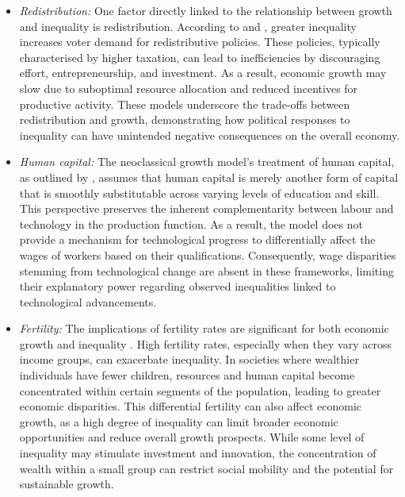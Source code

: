 \documentclass[12pt]{article}
\begin{document}
\begin{itemize}
    \item \textit{Redistribution:} One factor directly linked to the relationship between growth and inequality is redistribution. According to \textcite{alesina1994distributive} and \textcite{NBERw5658}, greater inequality increases voter demand for redistributive policies. These policies, typically characterised by higher taxation, can lead to inefficiencies by discouraging effort, entrepreneurship, and investment. As a result, economic growth may slow due to suboptimal resource allocation and reduced incentives for productive activity. These models underscore the trade-offs between redistribution and growth, demonstrating how political responses to inequality can have unintended negative consequences on the overall economy.
    \item \textit{Human capital:} The neoclassical growth model's treatment of human capital, as outlined by \textcite{Becker1993, Schultz1960}, assumes that human capital is merely another form of capital that is smoothly substitutable across varying levels of education and skill. This perspective preserves the inherent complementarity between labour and technology in the production function. As a result, the model does not provide a mechanism for technological progress to differentially affect the wages of workers based on their qualifications. Consequently, wage disparities stemming from technological change are absent in these frameworks, limiting their explanatory power regarding observed inequalities linked to technological advancements.
    \item \textit{Fertility:} The implications of fertility rates are significant for both economic growth and inequality \parencite{de2003inequality}. High fertility rates, especially when they vary across income groups, can exacerbate inequality. In societies where wealthier individuals have fewer children, resources and human capital become concentrated within certain segments of the population, leading to greater economic disparities. This differential fertility can also affect economic growth, as a high degree of inequality can limit broader economic opportunities and reduce overall growth prospects. While some level of inequality may stimulate investment and innovation, the concentration of wealth within a small group can restrict social mobility and the potential for sustainable growth.

\end{itemize}
\end{document}
